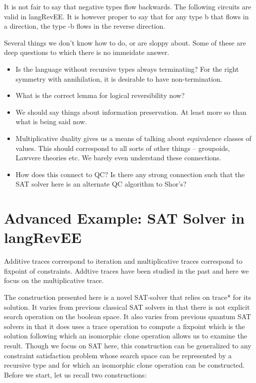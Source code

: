 \documentclass[preprint]{sigplanconf}
\begin{document}
It is not fair to say that negative types flow backwards. The
following circuits are valid in {{langRevEE}}. It is however proper to
say that for any type {{b}} that flows in a direction, the type {{-b}}
flows in the reverse direction.

Several things we don't know how to do, or are sloppy about. Some of
these are deep questions to which there is no immeidate answer.

\begin{itemize}

\item Is the language without recursive types always terminating? For
  the right symmetry with annihilation, it is desirable to have
  non-termination.

\item What is the correct lemma for logical reversibility now?

\item We should say things about information preservation. At least
  more so than what is being said now.


\item Multiplicative duality gives us a means of talking about
  equivalence classes of values. This should correspond to all sorts
  of other things -- groupoids, Lawvere theories etc. We barely even
  understand these connections.

\item How does this connect to QC? Is there any strong connection such
  that the SAT solver here is an alternate QC algorithm to Shor's?

\end{itemize}


\section{Advanced Example: SAT Solver in {{langRevEE}} }
\label{sec:prog}
\label{sec:sat-solver}

Additive traces correspond to iteration and multiplicative traces
correspond to fixpoint of constraints. Addtive traces have been
studied in the past \cite{infeffects} and here we focus on the
multiplicative trace.

The construction presented here is a novel SAT-solver that relies on
{{trace*}} for its solution. It varies from previous classical SAT
solvers in that there is not explicit search operation on the boolean
space. It also varies from previous quantum SAT solvers in that it
does uses a {{trace}} operation to compute a fixpoint which is the
solution following which an isomorphic clone operation allows us to
examine the result.  Though we focus on SAT here, this construction
can be generalized to any constraint satisfaction problem whose search
space can be represented by a recursive type and for which an
isomorphic clone operation can be constructed. Before we start, let us
recall two constructions:
\end{document}
